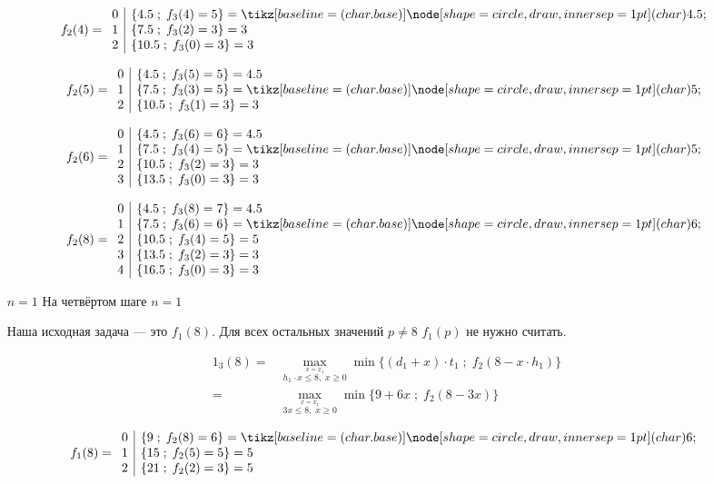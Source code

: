 \begin{enumerate}
	\[
	f_2(4) = \begin{array}{c|l}
		0 & \{4.5 \; ; \; f_3(4) = 5\} = \circled{4.5} \\
		1 & \{7.5 \; ; \; f_3(2) = 3\} = 3 \\
		2 & \{10.5 \; ; \; f_3(0) = 3\} = 3
	\end{array}
	\]
	
	\[
	f_2(5) = \begin{array}{c|l}
		0 & \{4.5 \; ; \; f_3(5) = 5\} = 4.5 \\
		1 & \{7.5 \; ; \; f_3(3) = 5\} = \circled{5} \\
		2 & \{10.5 \; ; \; f_3(1) = 3\} = 3
	\end{array}
	\]
	
	\[
	f_2(6) = \begin{array}{c|l}
		0 & \{4.5 \; ; \; f_3(6) = 6\} = 4.5 \\
		1 & \{7.5 \; ; \; f_3(4) = 5\} = \circled{5} \\
		2 & \{10.5 \; ; \; f_3(2) = 3\} = 3 \\
		3 & \{13.5 \; ; \; f_3(0) = 3\} = 3
	\end{array}
	\]
	
	\[
	f_2(8) = \begin{array}{c|l}
		0 & \{4.5 \; ; \; f_3(8) = 7\} = 4.5 \\
		1 & \{7.5 \; ; \; f_3(6) = 6\} = \circled{6} \\
		2 & \{10.5 \; ; \; f_3(4) = 5\} = 5 \\
		3 & \{13.5 \; ; \; f_3(2) = 3\} = 3 \\
		4 & \{16.5 \; ; \; f_3(0) = 3\} = 3
	\end{array}
	\]
	
	\item[$\boxed{n = 1}$] На четвёртом шаге $n = 1$
	
	Наша исходная задача --- это $f_1(8)$. Для всех остальных значений $p \neq 8$ $f_1(p)$ не нужно считать.
	
	\begin{align*}
		1_3(8) =& \max_{\stackrel{x = x_1}{h_1 \cdot x \le 8, \; x \ge 0}} \min\Big\{(d_1 + x) \cdot t_1 \; ; \; f_{2}(8 - x \cdot h_1)\Big\} \\
		=& \max_{\stackrel{x = x_1}{3x \le 8, \; x \ge 0}} \min\Big\{9 + 6x \; ; \; f_{2}(8 - 3x)\Big\}
	\end{align*}
	
	\[
	f_1(8) = \begin{array}{c|l}
		0 & \{9 \; ; \; f_2(8) = 6\} = \circled{6} \\
		1 & \{15 \; ; \; f_2(5) = 5\} = 5 \\
		2 & \{21 \; ; \; f_2(2) = 3\} = 5
	\end{array}
	\]
	

\end{enumerate}
